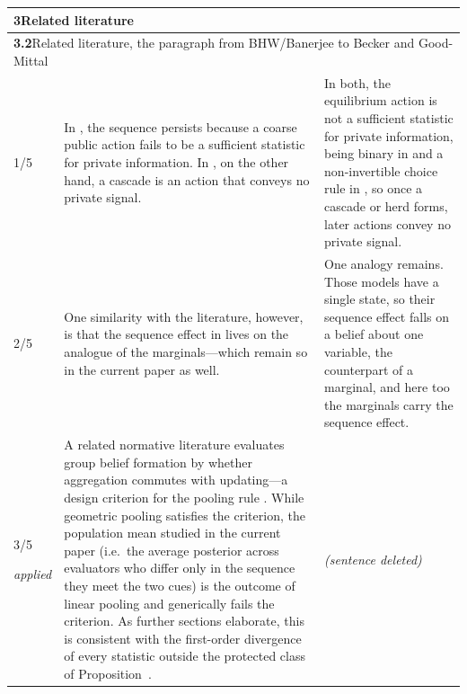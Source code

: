 \documentclass[10pt]{article}
\theoremstyle{definition}
\renewcommand{\ref}[1]{\textsc{\detokenize{#1}}}
\newcommand{\entryhead}[2]{\multicolumn{3}{|l|}{\rule{0pt}{2.6ex}\large\textbf{#1}\quad #2} \\ \hline}
\begin{document}
{\begin{longtable}{|p{0.9cm}|p{12.2cm}|p{12.2cm}|}
\multicolumn{3}{|l|}{\rule{0pt}{3.2ex}\Large\textbf{3\quad Related literature}} \\ \hline\hline
\entryhead{3.2}{Related literature, the paragraph from BHW/Banerjee to Becker and Good-Mittal\quad{\footnotesize\textit{(formerly C.11)}}}
1/5 & In \citet{Banerjee1992}, the sequence persists because a coarse public action fails to be a sufficient statistic for private information. In \citet{BHW1992}, on the other hand, a cascade is an action that conveys no private signal. & In both, the equilibrium action is not a sufficient statistic for private information, being binary in \citet{BHW1992} and a non-invertible choice rule in \citet{Banerjee1992}, so once a cascade or herd forms, later actions convey no private signal. \\ \hline
2/5 & One similarity with the literature, however, is that the sequence effect in \citep{BHW1992, Banerjee1992} lives on the analogue of the marginals---which remain so in the current paper as well. & One analogy remains. Those models have a single state, so their sequence effect falls on a belief about one variable, the counterpart of a marginal, and here too the marginals carry the sequence effect. \\ \hline
3/5 \par{\tiny\textit{applied}} & A related normative literature evaluates group belief formation by whether aggregation commutes with updating---a design criterion for the pooling rule \citep{Dietrich2021}. While geometric pooling \citep[Def.~1]{Dietrich2021} satisfies the criterion, the population mean studied in the current paper (i.e.\ the average posterior across evaluators who differ only in the sequence they meet the two cues) is the outcome of linear pooling and generically fails the criterion. As further sections elaborate, this is consistent with the first-order divergence of every statistic outside the protected class of Proposition~\ref{prop:PRO}. & \textit{(sentence deleted)} \\ \hline

\end{longtable}}
\end{document}
